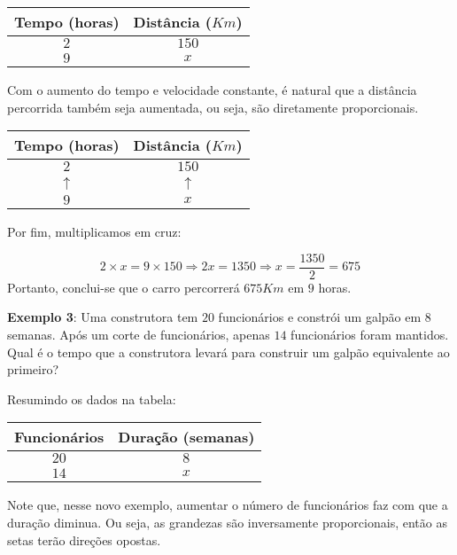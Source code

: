 \documentclass[12pt]{report}
\newcommand{\1}{\faThermometerEmpty}
\newcommand{\2}{\faThermometerQuarter}
\newcommand{\3}{\faThermometerHalf}
\newcommand{\4}{\faThermometerThreeQuarters}
\newcommand{\5}{\faThermometerFull}
\begin{document}
\begin{center}
\begin{tabular}{|c | c|} 
 \hline
 Tempo (horas) & Distância ($Km$)  \\ [0.5ex] 
 \hline \hline
 $2$ & $150$ \\ \hline
 $9$ & $x$ \\ 
 \hline
\end{tabular}
\end{center}

Com o aumento do tempo e velocidade constante, é natural que a distância percorrida também seja aumentada, ou seja, são diretamente proporcionais.

\begin{center}
\begin{tabular}{|c | c|} 
 \hline
 Tempo (horas) & Distância ($Km$)  \\ [0.5ex] 
 \hline \hline
 $2$ & $150$ \\ \hline
 $\uparrow$ &  $\uparrow$ \\ \hline
 $9$ & $x$ \\ 
 \hline
\end{tabular}
\end{center}

Por fim, multiplicamos em cruz:

$$
2 \times x = 9 \times 150 \Rightarrow 2x = 1350 \Rightarrow x = \frac{1350}{2} = 675
$$
Portanto, conclui-se que o carro percorrerá $675Km$ em $9$ horas.

\vspace{10pt}
\textbf{Exemplo 3}: Uma construtora tem $20$ funcionários e constrói um galpão em $8$ semanas. Após um corte de funcionários, apenas $14$ funcionários foram mantidos. Qual é o tempo que a construtora levará para construir um galpão equivalente ao primeiro?

Resumindo os dados na tabela:

\begin{center}
\begin{tabular}{|c | c|} 
 \hline
 Funcionários & Duração (semanas) \\ [0.5ex] 
 \hline \hline
 $20$ & $8$ \\ \hline
 $14$ & $x$ \\ 
 \hline
\end{tabular}
\end{center}

Note que, nesse novo exemplo, aumentar o número de funcionários faz com que a duração diminua. Ou seja, as grandezas são inversamente proporcionais, então as setas terão direções opostas.
\end{document}
